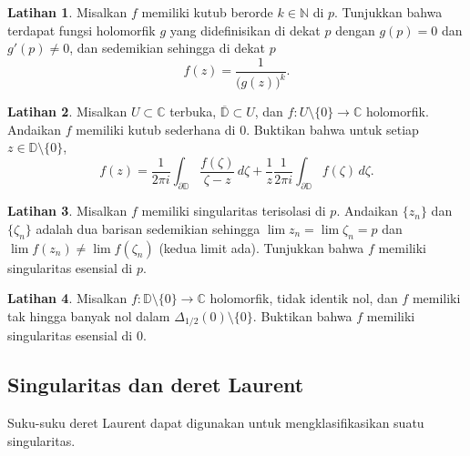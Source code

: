 \documentclass[12pt,openany]{book}
\newcommand{\C}{{\mathbb{C}}}
\newcommand{\N}{{\mathbb{N}}}
\newcommand{\D}{{\mathbb{D}}}
\theoremstyle{plain}
\theoremstyle{remark}
\theoremstyle{definition}
\newenvironment{exbox}{%
    \def\FrameCommand{\vrule width 1pt \relax\hspace{10pt}}%
    \MakeFramed{\advance\hsize-\width\FrameRestore}%
}{%
    \endMakeFramed
}
\theoremstyle{exercise}
\newtheorem{exercise}{Latihan}[section]
\theoremstyle{example}
\begin{document}
\begin{exbox}
\begin{exercise}
Misalkan $f$ memiliki kutub berorde $k \in \N$ di $p$.
Tunjukkan bahwa terdapat fungsi holomorfik $g$ yang didefinisikan di dekat $p$
dengan $g(p) = 0$ dan $g'(p) \neq 0$, dan sedemikian sehingga di dekat $p$
\begin{equation*}
f(z) = \frac{1}{{\bigl(g(z)\bigr)}^k} .
\end{equation*}
\end{exercise}

\begin{exercise}
Misalkan $U \subset \C$ terbuka, $\overline{\D} \subset U$,
dan $f \colon U \setminus \{0\} \to \C$ holomorfik.
Andaikan $f$ memiliki kutub sederhana di $0$. Buktikan bahwa untuk setiap
$z \in \D \setminus \{ 0 \}$,
\begin{equation*}
f(z) =
\frac{1}{2\pi i} \int_{\partial \D}
\frac{f(\zeta)}{\zeta-z} \, d\zeta
+
\frac{1}{z}
\frac{1}{2\pi i} \int_{\partial \D}
f(\zeta) \, d\zeta .
\end{equation*}
\end{exercise}

\begin{exercise}
Misalkan $f$ memiliki singularitas terisolasi di $p$. Andaikan
$\{ z_n \}$ dan $\{ \zeta_n \}$ adalah dua barisan sedemikian sehingga
$\lim z_n = \lim \zeta_n = p$ dan $\lim f(z_n) \neq \lim f(\zeta_n)$
(kedua limit ada).
Tunjukkan bahwa $f$ memiliki singularitas esensial di $p$.
\end{exercise}

\begin{exercise}
Misalkan $f \colon \D \setminus \{0\} \to \C$ holomorfik,
tidak identik nol, dan
$f$ memiliki tak hingga banyak nol dalam $\Delta_{1/2}(0) \setminus \{ 0 \}$.
Buktikan bahwa $f$ memiliki singularitas esensial di $0$.
\end{exercise}
\end{exbox}

\subsection{Singularitas dan deret Laurent}

Suku-suku deret Laurent dapat digunakan untuk
mengklasifikasikan suatu singularitas.
\end{document}

